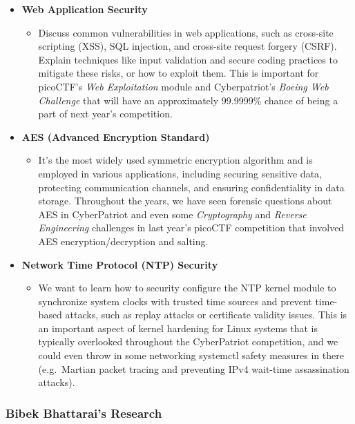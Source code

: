 \documentclass[
  letterpaper,
  DIV=11,
  numbers=noendperiod]{scrartcl}
\providecommand{\tightlist}{%
  \setlength{\itemsep}{0pt}\setlength{\parskip}{0pt}}\usepackage{longtable,booktabs,array}
\begin{document}
\begin{itemize}
\tightlist
\item
  \textbf{Web Application Security}

  \begin{itemize}
  \tightlist
  \item
    Discuss common vulnerabilities in web applications, such as
    cross-site scripting (XSS), SQL injection, and cross-site request
    forgery (CSRF). Explain techniques like input validation and secure
    coding practices to mitigate these risks, or how to exploit them.
    This is important for picoCTF's \emph{Web Exploitation} module and
    Cyberpatriot's \emph{Boeing Web Challenge} that will have an
    approximately 99.9999\% chance of being a part of next year's
    competition.
  \end{itemize}
\item
  \textbf{AES (Advanced Encryption Standard)}

  \begin{itemize}
  \tightlist
  \item
    It's the most widely used symmetric encryption algorithm and is
    employed in various applications, including securing sensitive data,
    protecting communication channels, and ensuring confidentiality in
    data storage. Throughout the years, we have seen forensic questions
    about AES in CyberPatriot and even some \emph{Cryptography} and
    \emph{Reverse Engineering} challenges in last year's picoCTF
    competition that involved AES encryption/decryption and salting.
  \end{itemize}
\item
  \textbf{Network Time Protocol (NTP) Security}

  \begin{itemize}
  \tightlist
  \item
    We want to learn how to security configure the NTP kernel module to
    synchronize system clocks with trusted time sources and prevent
    time-based attacks, such as replay attacks or certificate validity
    issues. This is an important aspect of kernel hardening for Linux
    systems that is typically overlooked throughout the CyberPatriot
    competition, and we could even throw in some networking systemctl
    safety measures in there (e.g.~Martian packet tracing and preventing
    IPv4 wait-time assassination attacks).
  \end{itemize}
\end{itemize}

\hypertarget{bibek-bhattarais-research}{%
\subsubsection{Bibek Bhattarai's
Research}\label{bibek-bhattarais-research}}
\end{document}
